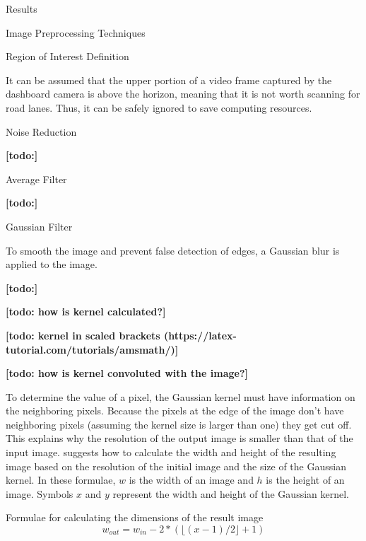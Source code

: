 \documentclass{matthijs}
\begin{document}
\begin{hoofdstuk}{Results}
\begin{paragraaf}{Image Preprocessing Techniques}
\begin{subparagraaf}{Region of Interest Definition}
				\bigskip

				It can be assumed that the upper portion of a video frame captured by the dashboard camera is above the horizon, meaning that it is not worth scanning for road lanes.
				Thus, it can be safely ignored to save computing resources.

			\end{subparagraaf}

			\begin{subparagraaf}{Noise Reduction}

				\textbf{[todo:]}

				\begin{subsubparagraaf}{Average Filter}

					\textbf{[todo:]}
				
				\end{subsubparagraaf}

				\begin{subsubparagraaf}{Gaussian Filter}

					To smooth the image and prevent false detection of edges, a Gaussian blur is applied to the image.

					\bigskip

					\textbf{[todo:]}

					\textbf{[todo: how is kernel calculated?]}

					\textbf{[todo: kernel in scaled brackets (https://latex-tutorial.com/tutorials/amsmath/)]}

					\textbf{[todo: how is kernel convoluted with the image?]}

					\bigskip

					To determine the value of a pixel, the Gaussian kernel must have information on the neighboring pixels.
					Because the pixels at the edge of the image don't have neighboring pixels (assuming the kernel size is larger than one) they get cut off.
					This explains why the resolution of the output image is smaller than that of the input image.
					 suggests how to calculate the width and height of the resulting image based on the resolution of the initial image and the size of the Gaussian kernel.
					In these formulae, $w$ is the width of an image and $h$ is the height of an image.
					Symbols $x$ and $y$ represent the width and height of the Gaussian kernel.

					\begin{figuur}{Formulae for calculating the dimensions of the result image}
						\begin{equation*}
							w_{out} = w_{in} - 2 * (\lfloor(x - 1) / 2\rfloor + 1)
						\end{equation*}


\end{figuur}
\end{subsubparagraaf}
\end{subparagraaf}
\end{paragraaf}
\end{hoofdstuk}
\end{document}
